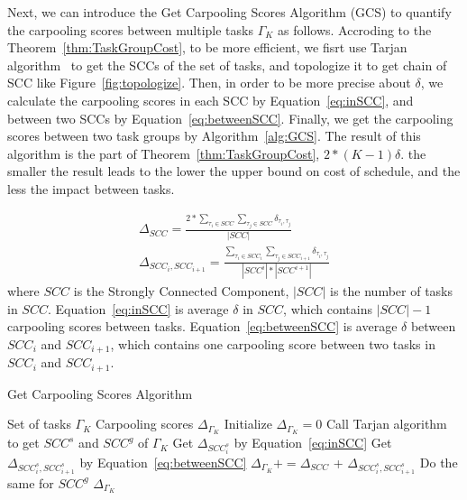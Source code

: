 \documentclass[sigconf,anonymous]{aamas}
\begin{document}
Next, we can introduce the Get Carpooling Scores Algorithm (GCS)
to quantify the carpooling scores between multiple tasks $\Gamma_K$ as follows.
Accroding to the Theorem~\ref{thm:TaskGroupCost},
to be more efficient,
we fisrt use Tarjan algorithm~\cite{tarjan1972depth} to get the SCCs of the set of tasks,
and topologize it to get chain of SCC like Figure~\ref{fig:topologize}.
Then, in order to be more precise about $\delta$,
we calculate the carpooling scores in each SCC by Equation~\ref{eq:inSCC},
and between two SCCs by Equation~\ref{eq:betweenSCC}.
Finally, we get the carpooling scores between two task groups by Algorithm~\ref{alg:GCS}.
The result of this algorithm is the part of Theorem~\ref{thm:TaskGroupCost}, $2*(K-1)\delta$.
the smaller the result leads to
the lower the upper bound on cost of schedule, and the less the impact between tasks.

\begin{eqnarray}
  \label{eq:inSCC}
    \Delta_{SCC} =\frac{2 {\ast} \sum_{\tau_i \in SCC}{\sum_{\tau_j \in SCC}{\delta_{\tau_i, \tau_j}}} }
    {|SCC|}\\
  \label{eq:betweenSCC}
    \Delta_{SCC_i, SCC_{i+1}} = \frac{\sum_{\tau_i \in SCC_i}{\sum_{\tau_j \in SCC_{i+1}}{\delta_{\tau_i, \tau_j}}} }
    {|SCC^i|{\ast}|SCC^{i+1}|}
\end{eqnarray}
where $SCC$ is the Strongly Connected Component,
$|SCC|$ is the number of tasks in $SCC$.
Equation~\ref{eq:inSCC} is average $\delta$ in $SCC$,
which contains $|SCC|-1$ carpooling scores between tasks.
Equation~\ref{eq:betweenSCC} is average $\delta$ between $SCC_i$ and $SCC_{i+1}$,
which contains one carpooling score between two tasks in $SCC_i$ and $SCC_{i+1}$.


\begin{algorithm}[htbp]
\caption{Get Carpooling Scores Algorithm}
\label{alg:GCS}
\begin{algorithmic}[1]
\Require Set of tasks $\Gamma_K$ %
\Ensure Carpooling scores $\Delta_{\Gamma_K}$ %
\State Initialize $\Delta_{\Gamma_K} = 0$
\State Call Tarjan algorithm to get $SCC^s$ and $SCC^g$ of $\Gamma_K$
    \State Get $\Delta_{SCC^s_i}$ by Equation~\ref{eq:inSCC}
        \State Get $\Delta_{SCC^s_i, SCC^s_{i+1}}$ by Equation~\ref{eq:betweenSCC}
    \EndIf
    \State $\Delta_{\Gamma_K} += \Delta_{SCC}$ + $\Delta_{SCC^s_i, SCC^s_{i+1}}$
\EndFor
\State Do the same for $SCC^g$
\State \Return $\Delta_{\Gamma_K}$
\end{algorithmic}
\end{algorithm}
\end{document}
